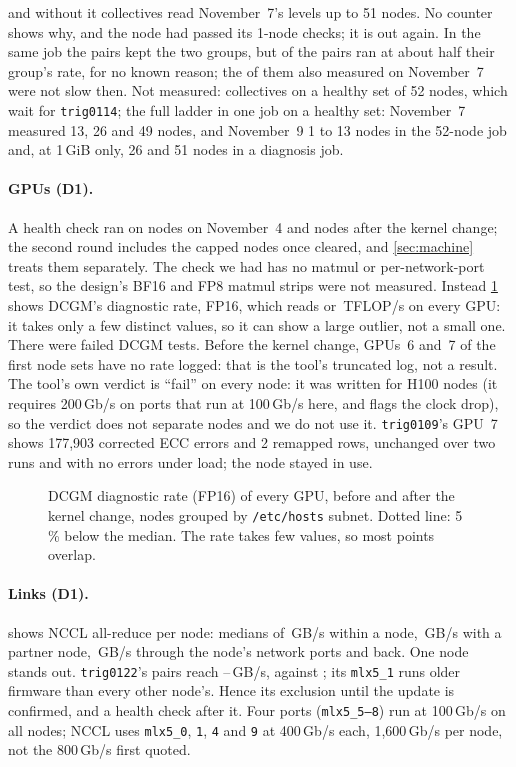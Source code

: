 and without it collectives read November~7's levels up to 51 nodes. No counter shows why, and the node had passed its 1-node checks; it is out again. In the same job the pairs kept the two groups, but \TriNineLow{} of the \TriNinePairs{} pairs ran at about half their group's rate, for no known reason; the \TriNineLowCommon{} of them also measured on November~7 were not slow then. Not measured: collectives on a healthy set of 52 nodes, which wait for \texttt{trig0114}; the full ladder in one job on a healthy set: November~7 measured 13, 26 and 49 nodes, and November~9 1 to 13 nodes in the 52-node job and, at 1\,GiB only, 26 and 51 nodes in a diagnosis job.

\paragraph{GPUs (D1).} A health check ran on \TriNodesChecked{} nodes on November~4 and \TriNodesCheckedAfter{} nodes after the kernel change; the second round includes the capped nodes once cleared, and \cref{sec:machine} treats them separately. The check we had has no matmul or per-network-port test, so the design's BF16 and FP8 matmul strips were not measured. Instead \cref{fig:health_gpus} shows DCGM's diagnostic rate, FP16, which reads \TriDcgmHi{} or \TriDcgmLo\,TFLOP/s on every GPU: it takes only a few distinct values, so it can show a large outlier, not a small one. There were \TriDcgmFailed{} failed DCGM tests.
Before the kernel change, GPUs~6 and~7 of the first node sets have no rate logged: that is the tool's truncated log, not a result.
The tool's own verdict is ``fail'' on every node: it was written for H100 nodes (it requires 200\,Gb/s on ports that run at 100\,Gb/s here, and flags the clock drop), so the verdict does not separate nodes and we do not use it. \texttt{trig0109}'s GPU~7 shows 177,903 corrected ECC errors and 2 remapped rows, unchanged over two runs and with no errors under load; the node stayed in use.

\begin{figure}[h]
  \centering{}
  \caption{DCGM diagnostic rate (FP16) of every GPU, before and after the kernel change, nodes grouped by \texttt{/etc/hosts} subnet. Dotted line: 5\,\% below the median. The rate takes few values, so most points overlap. }
  \label{fig:health_gpus}
\end{figure}

\paragraph{Links (D1).}  shows NCCL all-reduce per node: medians of \TriIntra\,GB/s within a node, \TriPairBus\,GB/s with a partner node, \TriLoopback\,GB/s through the node's network ports and back. One node stands out. \texttt{trig0122}'s pairs reach \TriPairBusLo--\TriPairBusLoHi\,GB/s, against \TriPairBus; its \texttt{mlx5\_1} runs older firmware than every other node's. Hence its exclusion until the update is confirmed, and a health check after it. Four ports (\texttt{mlx5\_5--8}) run at 100\,Gb/s on all nodes; NCCL uses \texttt{mlx5\_0}, \texttt{1}, \texttt{4} and \texttt{9} at 400\,Gb/s each, 1,600\,Gb/s per node, not the 800\,Gb/s first quoted.

